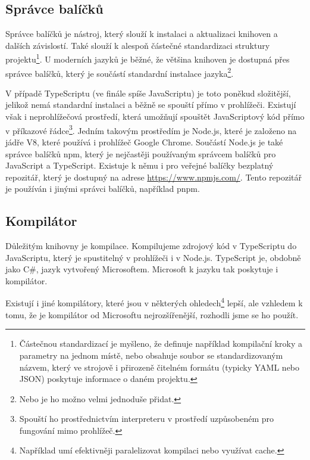 \subsection{Správce balíčků}
\label{subsec:package-manager}

Správce balíčků je nástroj, který slouží k instalaci a aktualizaci knihoven a dalších závislostí.
Také slouží k alespoň částečné standardizaci struktury projektu\footnote{Částečnou standardizací je myšleno, že definuje například kompilační kroky a parametry na jednom místě, nebo obsahuje soubor se standardizovaným názvem, který ve strojově i přirozeně čitelném formátu (typicky YAML nebo JSON) poskytuje informace o daném projektu.}. 
U moderních jazyků je běžné, že většina knihoven je dostupná přes správce balíčků, který je součástí standardní instalace jazyka\footnote{Nebo je ho možno velmi jednoduše přidat.}\cite{npm:docs,Rust:cargo,golang:pkg,python:pip}.

V případě TypeScriptu (ve finále spíše JavaScriptu) je toto poněkud složitější, jelikož nemá standardní instalaci a běžně se spouští přímo v prohlížeči.
Existují však i neprohlížečová prostředí, která umožňují spouštět JavaScriptový kód přímo v příkazové řádce\footnote{Spouští ho prostřednictvím interpreteru v prostředí uzpůsobeném pro fungování mimo prohlížeč.}. 
Jedním takovým prostředím je Node.js, které je založeno na jádře V8\cite{node:v8}, které používá i prohlížeč Google Chrome\cite{v8}.
Součástí Node.js je také správce balíčků npm\cite{npm:docs,geometryjs:wiki:technologies}, který je nejčastěji používaným správcem balíčků pro JavaScript a TypeScript. 
Existuje k němu i pro veřejné balíčky bezplatný repozitář, který je dostupný na adrese \url{https://www.npmjs.com/}.
Tento repozitář je používán i jinými správci balíčků, například pnpm\cite{pnpm}.

\subsection{Kompilátor}
\label{subsec:compiler}

Důležitým  knihovny je kompilace. 
Kompilujeme zdrojový kód v TypeScriptu do JavaScriptu, který je spustitelný v prohlížeči i v Node.js. 
TypeScript je, obdobně jako C\#, jazyk vytvořený Microsoftem\cite{TypeScript}.
Microsoft k jazyku tak poskytuje i kompilátor.

Existují i jiné kompilátory, které jsou v některých ohledech\footnote{Například umí efektivněji paralelizovat kompilaci nebo využívat cache.} lepší, ale vzhledem k tomu, že je kompilátor od Microsoftu nejrozšířenější, rozhodli jsme se ho použít.

